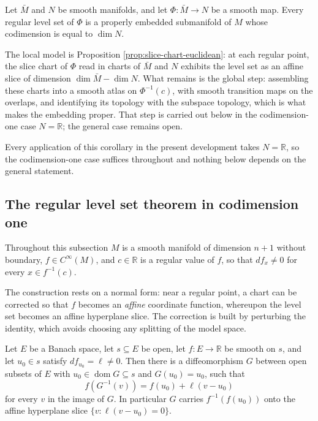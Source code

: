 \begin{corollary}
\label{cor:regular-level-set}

Let $\bar{M}$ and $N$ be smooth manifolds, and let $\Phi: \bar{M} \to N$ be a smooth map. Every regular level set of $\Phi$ is a properly embedded submanifold of $M$ whose codimension is equal to $\dim N$.
\end{corollary}

The local model is Proposition \ref{prop:slice-chart-euclidean}: at each regular point, the slice chart of $\Phi$ read in charts of $\bar{M}$ and $N$ exhibits the level set as an affine slice of dimension $\dim \bar{M} - \dim N$. What remains is the global step: assembling these charts into a smooth atlas on $\Phi^{-1}(c)$, with smooth transition maps on the overlaps, and identifying its topology with the subspace topology, which is what makes the embedding proper. That step is carried out below in the codimension-one case $N = \mathbb{R}$; the general case remains open.

Every application of this corollary in the present development takes $N = \mathbb{R}$, so the codimension-one case suffices throughout and nothing below depends on the general statement.

\subsection*{The regular level set theorem in codimension one}

Throughout this subsection $M$ is a smooth manifold of dimension $n+1$ without boundary, $f \in C^\infty(M)$, and $c \in \mathbb{R}$ is a regular value of $f$, so that $df_x \neq 0$ for every $x \in f^{-1}(c)$.

The construction rests on a normal form: near a regular point, a chart can be corrected so that $f$ becomes an \emph{affine} coordinate function, whereupon the level set becomes an affine hyperplane slice. The correction is built by perturbing the identity, which avoids choosing any splitting of the model space.

\begin{lemma}
\label{lem:straighten-scalar-affine}




Let $E$ be a Banach space, let $s \subseteq E$ be open, let $f : E \to \mathbb{R}$ be smooth on $s$, and let $u_0 \in s$ satisfy $df_{u_0} = \ell \neq 0$. Then there is a diffeomorphism $G$ between open subsets of $E$ with $u_0 \in \operatorname{dom} G \subseteq s$ and $G(u_0) = u_0$, such that
\[
  f(G^{-1}(v)) = f(u_0) + \ell(v - u_0)
\]
for every $v$ in the image of $G$. In particular $G$ carries $f^{-1}(f(u_0))$ onto the affine hyperplane slice $\{v : \ell(v - u_0) = 0\}$.
\end{lemma}

